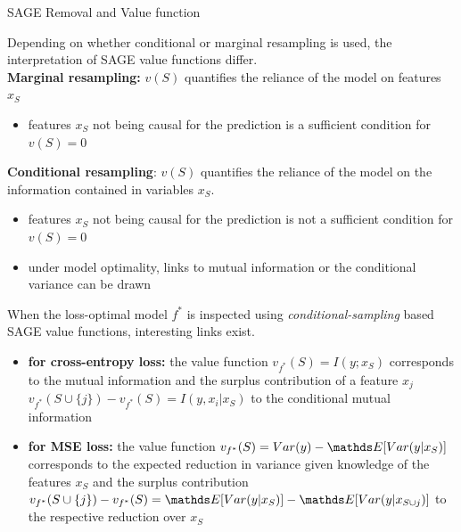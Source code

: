 \documentclass[11pt,compress,t,notes=noshow, xcolor=table]{beamer}
\begin{document}
\begin{vbframe}{SAGE Removal and Value function}

Depending on whether conditional or marginal resampling is used, the interpretation of SAGE value functions differ.\\
\lz
\textbf{Marginal resampling:} $v(S)$ quantifies the reliance of the model on features $x_S$
\begin{itemize}
  \item features $x_S$ not being causal for the prediction is a sufficient condition for $v(S) = 0$
\end{itemize}

\textbf{Conditional resampling}: $v(S)$ quantifies the reliance of the model on the information contained in variables $x_S$.
\begin{itemize}
  \item features $x_S$ not being causal for the prediction is not a sufficient condition for $v(S) = 0$
  \item under model optimality, links to mutual information or the conditional variance can be drawn
\end{itemize}

\framebreak

When the loss-optimal model $f^*$ is inspected using \textit{conditional-sampling} based SAGE value functions, interesting links exist.
\begin{itemize}
  \item \textbf{for cross-entropy loss:} the value function $v_{f^*}(S) = I(y;x_S)$ corresponds to the mutual information and the surplus contribution of a feature $x_j$ $v_{f^*}(S \cup \{j\}) - v_{f^*}(S) = I(y,x_i|x_S)$ to the conditional mutual information
  \item \textbf{for MSE loss:} the value function $v_{f^*}(S) = Var(y) - \E[Var(y|x_S)]$ corresponds to the expected reduction in variance given knowledge of the features $x_S$ and the surplus contribution $v_{f^*}(S \cup \{j\}) - v_{f^*}(S) = \E[Var(y|x_S)] - \E[Var(y|x_{S \cup {j}})]$ to the respective reduction over $x_S$
\end{itemize}

\framebreak


\end{vbframe}
\end{document}

